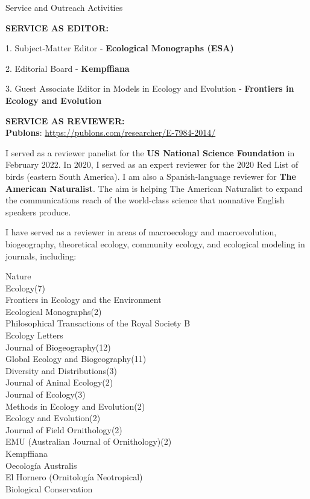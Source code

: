 \documentclass{resume} %
\begin{document}

\begin{rSection}{Service and Outreach Activities}

\textbf{SERVICE AS EDITOR:} %
\normalfont

\item 1. Subject-Matter Editor - {\bf Ecological Monographs (ESA)} 
\item 2. Editorial Board - {\bf Kempffiana} 
\item 3. Guest Associate Editor in Models in Ecology and Evolution - {\bf Frontiers in Ecology and Evolution}

\textbf{SERVICE AS REVIEWER:} \smallskip \\ 
\textbf{Publons}: \url{https://publons.com/researcher/E-7984-2014/}

\normalfont

I served as a reviewer panelist for the {\bf US National Science Foundation} in February 2022. In 2020, I served as an expert reviewer for the 2020 Red List of birds (eastern South America). I am also a Spanish-language reviewer for {\bf The American Naturalist}. The aim is helping The American Naturalist to expand the communications reach of the world-class science that nonnative English speakers produce.

I have served as a reviewer in areas of macroecology and macroevolution, biogeography, theoretical ecology, community ecology, and ecological modeling in journals, including: \smallskip

\begin{multicols}{2}

Nature \\
Ecology(7) \\
Frontiers in Ecology and the Environment \\
Ecological Monographs(2) \\ 
Philosophical Transactions of the Royal Society B \\
Ecology Letters \\
Journal of Biogeography(12) \\ 
Global Ecology and Biogeography(11) \\
Diversity and Distributions(3) \\ 
Journal of Aninal Ecology(2) \\
Journal of Ecology(3) \\ 
Methods in Ecology and Evolution(2) \\ 
Ecology and Evolution(2) \\ 
Journal of Field Ornithology(2) \\
EMU (Australian Journal of Ornithology)(2) \\ 
Kempffiana \\ 
Oecología Australis \\
El Hornero (Ornitología Neotropical) \\ 
Biological Conservation \smallskip


\end{multicols}
\end{rSection}
\end{document}
